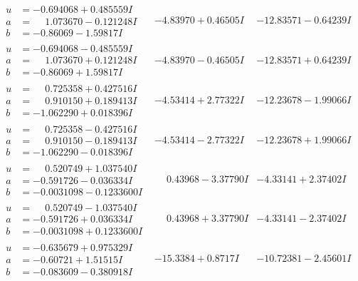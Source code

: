\documentclass[1p]{elsarticle_modified}
\theoremstyle{definition}
\begin{document}
$$\begin{array}{c|c|c}
\begin{aligned}
u &= -0.694068 + 0.485559 I \\
a &= \phantom{-}1.073670 - 0.121248 I \\
b &= -0.86069 - 1.59817 I\end{aligned}
 & -4.83970 + 0.46505 I & -12.83571 - 0.64239 I \\ \hline\begin{aligned}
u &= -0.694068 - 0.485559 I \\
a &= \phantom{-}1.073670 + 0.121248 I \\
b &= -0.86069 + 1.59817 I\end{aligned}
 & -4.83970 - 0.46505 I & -12.83571 + 0.64239 I \\ \hline\begin{aligned}
u &= \phantom{-}0.725358 + 0.427516 I \\
a &= \phantom{-}0.910150 + 0.189413 I \\
b &= -1.062290 + 0.018396 I\end{aligned}
 & -4.53414 + 2.77322 I & -12.23678 - 1.99066 I \\ \hline\begin{aligned}
u &= \phantom{-}0.725358 - 0.427516 I \\
a &= \phantom{-}0.910150 - 0.189413 I \\
b &= -1.062290 - 0.018396 I\end{aligned}
 & -4.53414 - 2.77322 I & -12.23678 + 1.99066 I \\ \hline\begin{aligned}
u &= \phantom{-}0.520749 + 1.037540 I \\
a &= -0.591726 - 0.036334 I \\
b &= -0.0031098 - 0.1233600 I\end{aligned}
 & \phantom{-}0.43968 - 3.37790 I & -4.33141 + 2.37402 I \\ \hline\begin{aligned}
u &= \phantom{-}0.520749 - 1.037540 I \\
a &= -0.591726 + 0.036334 I \\
b &= -0.0031098 + 0.1233600 I\end{aligned}
 & \phantom{-}0.43968 + 3.37790 I & -4.33141 - 2.37402 I \\ \hline\begin{aligned}
u &= -0.635679 + 0.975329 I \\
a &= -0.60721 + 1.51515 I \\
b &= -0.083609 - 0.380918 I\end{aligned}
 & -15.3384 + 0.8717 I & -10.72381 - 2.45601 I \\ \hline\begin{aligned}

\end{aligned}
\end{array}$$
\end{document}
